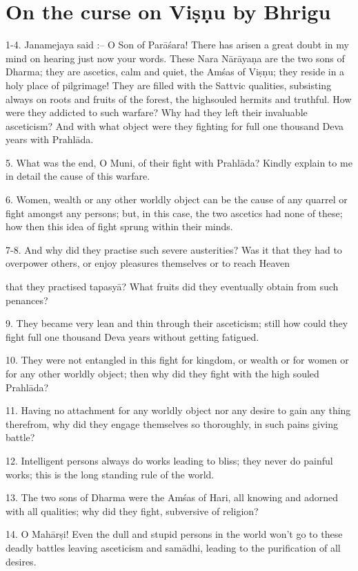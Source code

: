 \chapter{On the curse on Vi\d{s}\d{n}u by Bhrigu}

1-4. Janamejaya said :-- O Son of Par\=a\'sara! There has arisen a great doubt in my mind on hearing just now your words. These Nara N\=ar\=aya\d{n}a are the two sons of Dharma; they are ascetics, calm and quiet, the Am\'sas of Vi\d{s}\d{n}u; they reside in a holy place of pilgrimage! They are filled with the Sattvic qualities, subsisting always on roots and fruits of the forest, the highsouled hermits and truthful. How were they addicted to such warfare? Why had they left their invaluable asceticism? And with what object were they fighting for full one thousand Deva years with Prahl\=ada.

5. What was the end, O Muni, of their fight with Prahl\=ada? Kindly explain to me in detail the cause of this warfare.

6. Women, wealth or any other worldly object can be the cause of any quarrel or fight amongst any persons; but, in this case, the two ascetics had none of these; how then this idea of fight sprung within their minds.

7-8. And why did they practise such severe austerities? Was it that they had to overpower others, or enjoy pleasures themselves or to reach Heaven

that they practised tapasy\=a? What fruits did they eventually obtain from such penances?

9. They became very lean and thin through their asceticism; still how could they fight full one thousand Deva years without getting fatigued.

10. They were not entangled in this fight for kingdom, or wealth or for women or for any other worldly object; then why did they fight with the high souled Prahl\=ada?

11. Having no attachment for any worldly object nor any desire to gain any thing therefrom, why did they engage themselves so thoroughly, in such pains giving battle?

12. Intelligent persons always do works leading to bliss; they never do painful works; this is the long standing rule of the world.

13. The two sons of Dharma were the Am\'sas of Hari, all knowing and adorned with all qualities; why did they fight, subversive of religion?

14. O Mah\=ar\d{s}i! Even the dull and stupid persons in the world won't go to these deadly battles leaving asceticism and sam\=adhi, leading to the purification of all desires.

